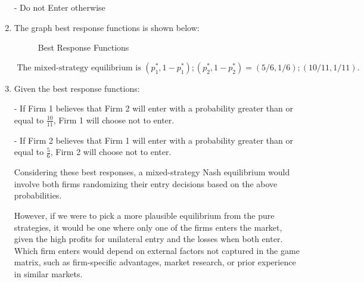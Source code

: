 \documentclass[UTF8,titlepage]{article}
\numberwithin{figure}{section}
\begin{document}
\begin{enumerate}
- Do not Enter otherwise

\item The graph best response functions is shown below:
\begin{figure}[H]
\centering
 \caption{Best Response Functions}
 \label{}
\end{figure}

$\text { The mixed-strategy equilibrium is }\left(p_{1}^{*}, 1-p_{1}^{*}\right) ;\left(p_{2}^{*}, 1-p_{2}^{*}\right)=(5 / 6,1 / 6) ;(10 / 11,1 / 11) \text {. }$
\item Given the best response functions:

- If Firm 1 believes that Firm 2 will enter with a probability greater than or equal to \(\frac{10}{11}\), Firm 1 will choose not to enter.

- If Firm 2 believes that Firm 1 will enter with a probability greater than or equal to \(\frac{5}{6}\), Firm 2 will choose not to enter.

Considering these best responses, a mixed-strategy Nash equilibrium would involve both firms randomizing their entry decisions based on the above probabilities.

However, if we were to pick a more plausible equilibrium from the pure strategies, it would be one where only one of the firms enters the market, given the high profits for unilateral entry and the losses when both enter. Which firm enters would depend on external factors not captured in the game matrix, such as firm-specific advantages, market research, or prior experience in similar markets.
\end{enumerate}
\end{document}
